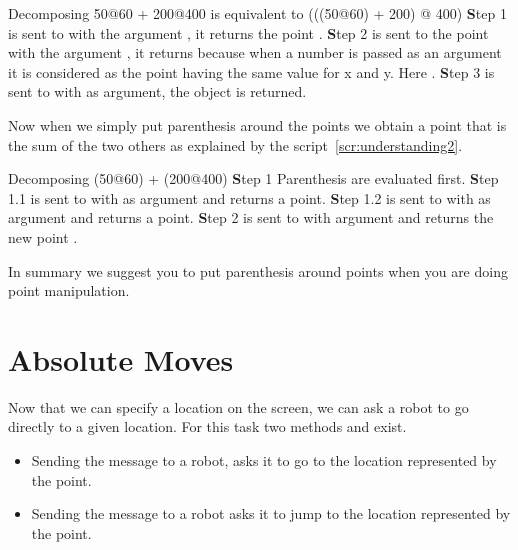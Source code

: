 \begin{scriptwithtitle}{Decomposing }\label{scr:understanding}
50@60 + 200@400 {\rmfamily is equivalent to }(((50@60) + 200) @ 400)
{\rmfamily
{\textbf Step 1}
    is sent to  with the argument , it returns the point . 
{\textbf Step 2}
   \ct{+} is sent to the point  with the argument , it returns
    because when a number is passed as an argument it is 
   considered as the point having the same value for x and y. 
   Here . 
{\textbf Step 3} 
    is sent to  with  as argument, the object
    is returned.}
\end{scriptwithtitle}

Now when we simply put parenthesis around the points we obtain a point that is the sum of the two others as explained by the script~\ref{scr:understanding2}.

\begin{scriptwithtitle}{Decomposing }\label{scr:understanding2}
(50@60) + (200@400)
{\rmfamily
{\textbf Step 1} 
   Parenthesis are evaluated first.
{\textbf Step 1.1} 
   is sent to  with  as argument and returns a point.
{\textbf Step 1.2} 
   is sent to  with  as argument and returns a point.
{\textbf Step 2} 
   \ct{+} is sent to  with argument  and 
    returns the new point .}
\end{scriptwithtitle}

In summary we suggest you to put parenthesis around points when you are doing point manipulation.

\section{Absolute Moves}
Now that we can specify a location on the screen, we can ask a robot to go directly to a given location. For this task two methods  and   exist. 
\begin{itemize}
\item Sending the message  to a robot, asks it to go to the location represented by the point. 
\item Sending the message  to a robot asks it to jump to the location
 represented by the point.
\end{itemize}

